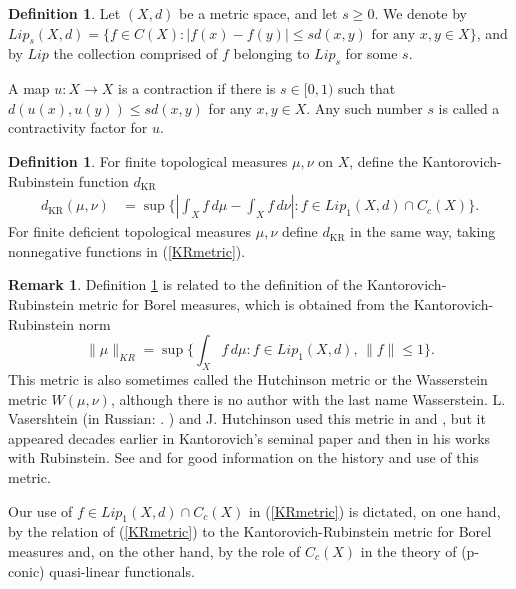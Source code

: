 \documentclass[sn-mathphys-num]{sn-jnl}%
\theoremstyle{thmstyleone}%
\theoremstyle{definition}
\newtheorem{definition}[theorem]{Definition}
\newtheorem{remark}[theorem]{Remark}
\begin{document}
\begin{definition} \label{contrFact}
Let $(X, d)$ be a metric space, and let $s \ge 0$. We denote by  
$Lip_s(X,d) = \{ f \in C(X): | f(x) - f(y)| \le s d(x,y) \mbox{  for any  } x, y \in X \}$, and by $Lip$ the collection comprised of $f$  belonging to 
$Lip_s$ for some $s$.

A map $u: X \longrightarrow X$ is a contraction if there is $s \in [0,1)$ such that 
$d(u(x), u(y)) \le s d(x,y)$ for any $x,y \in X$. Any such number $s$ is called a contractivity factor for $u$.
\end{definition}

\begin{definition} \label{KRfunction}
For finite topological measures $ \mu, \nu$ on $X$, define the Kantorovich-Rubinstein function $d_{\text{KR}}$ 
\begin{align} \label{KRmetric}
d_{\text{KR}}(\mu, \nu) &= \sup \{| \int_X f \, d\mu -  \int_X f \, d\nu|: f \in Lip_1(X,d) \cap C_c(X)  \}. 
\end{align}
For finite deficient topological measures $ \mu, \nu$ define $d_{\text{KR}}$ 
in the same way, taking nonnegative functions in (\ref{KRmetric}). 
\end{definition} 

\begin{remark}
Definition \ref{KRfunction} is related to the definition of the Kantorovich-Rubinstein metric
for Borel measures, which is obtained from the Kantorovich-Rubinstein norm
$$ \| \mu \|_{KR} = \sup \{ \int_X f \, d\mu: f \in Lip_1(X,d), \, \| f \| \le 1 \}.$$ 
This metric is also sometimes called the Hutchinson metric or 
the Wasserstein metric $W(\mu, \nu)$, although there is no author with the last name Wasserstein. 
L. Vasershtein  (in Russian:
    \textrm{\CYRL.  \CYRV\cyra\cyrs\cyre\cyrr\cyrsh\cyrt\cyre\cyrishrt\cyrn}
) 
and J. Hutchinson used this metric in  \cite{Vasershtein} and \cite{Hutchinson},
but it appeared decades earlier in Kantorovich's  seminal paper \cite{Kantorovich} 
and then in his works with Rubinstein. 
See \cite[pp. 453--454]{Bogachev} and \cite{BogachevKolesnikov} for good information on the history and use of this metric.

Our use of $f \in Lip_1(X,d) \cap C_c(X)$ in (\ref{KRmetric}) is dictated, on one hand, by the relation of (\ref{KRmetric})  
to the Kantorovich-Rubinstein metric for Borel measures and, 
on the other hand, by the role of $C_c(X)$ in the theory of (p-conic) quasi-linear functionals.
\end{remark}
\end{document}
